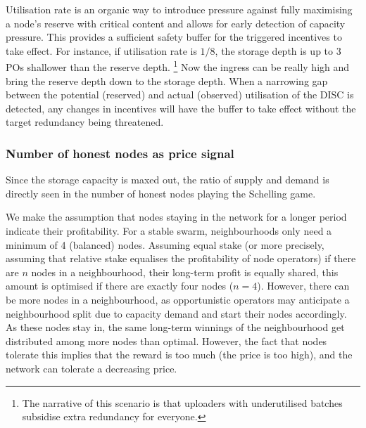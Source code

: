 Utilisation rate is an organic way to introduce pressure against fully maximising a node's reserve with critical content and allows for early detection of capacity pressure. This provides a sufficient safety buffer for the triggered incentives to take effect. For instance, if utilisation rate is $1/8$, the storage depth is up to 3 POs shallower than the reserve depth.%
%
\footnote{The narrative of this scenario is that uploaders with underutilised batches subsidise extra redundancy for everyone.}
%
Now the ingress can be really high and bring the reserve depth down to the storage depth. When a narrowing gap between the potential (reserved) and actual (observed) utilisation of the DISC is detected, any changes in incentives will have the buffer to take effect without the target redundancy being threatened. 





\subsubsection{Number of honest nodes as price signal}

Since the storage capacity is maxed out, the ratio of supply and demand is directly seen in the number of honest nodes playing the Schelling game. 

We make the assumption that nodes staying in the network for a longer period indicate their profitability. For a stable swarm, neighbourhoods  only need a minimum of 4 (balanced) nodes. Assuming equal stake (or more precisely, assuming that relative stake equalises the profitability of node operators) if there are $n$ nodes in a neighbourhood, their long-term profit is equally shared, this amount is optimised if there are exactly four nodes ($n=4$). However, there can be more nodes in a neighbourhood, as opportunistic operators may anticipate a neighbourhood split due to capacity demand and start their nodes accordingly. As these nodes stay in, the same long-term winnings of the neighbourhood get distributed among more nodes than optimal.
However, the fact that nodes tolerate this implies that the reward is too much (the price is too high), and the network can tolerate a decreasing price.

